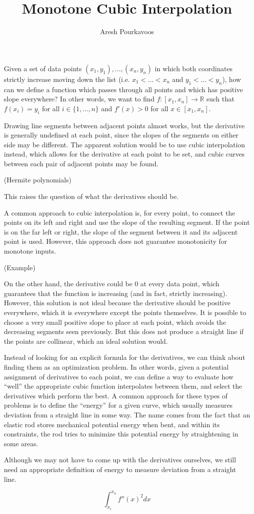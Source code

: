 \documentclass{article}
\begin{document}
\title{Monotone Cubic Interpolation}
\author{Aresh Pourkavoos}
\maketitle

Given a set of data points $(x_1, y_1), \ldots, (x_n, y_n)$
in which both coordinates strictly increase moving down the list
(i.e. $x_1 < \ldots < x_n$ and $y_1 < \ldots < y_n$),
how can we define a function which passes through all points
and which has positive slope everywhere?
In other words, we want to find $f : [x_1, x_n] \rightarrow \mathbb{R}$
such that $f(x_i) = y_i$ for all $i \in \{1, \ldots, n\}$
and $f'(x) > 0$ for all $x \in [x_1, x_n]$.

Drawing line segments between adjacent points almost works,
but the derivative is generally undefined at each point,
since the slopes of the segments on either side may be different.
The apparent solution would be to use cubic interpolation instead,
which allows for the derivative at each point to be set,
and cubic curves between each pair of adjacent points may be found.

(Hermite polynomials)

This raises the question of what the derivatives should be.

A common approach to cubic interpolation
is, for every point,
to connect the points on its left and right
and use the slope of the resulting segment.
If the point is on the far left or right,
the slope of the segment between it and its adjacent point is used.
However, this approach does not guarantee monotonicity for monotone inputs.

(Example)

On the other hand, the derivative could be 0 at every data point,
which guarantees that the function is increasing (and in fact, strictly increasing).
However, this solution is not ideal because
the derivative should be positive everywhere,
which it is everywhere except the points themselves.
It is possible to choose a very small positive slope to place at each point,
which avoids the decreasing segments seen previously.
But this does not produce a straight line if the points are collinear,
which an ideal solution would.

Instead of looking for an explicit formula for the derivatives,
we can think about finding them as an optimization problem.
In other words, given a potential assignment of derivatives to each point,
we can define a way to evaluate how ``well''
the appropriate cubic function interpolates between them,
and select the derivatives which perform the best.
A common approach for these types of problems is to define the ``energy'' for a given curve,
which usually measures deviation from a straight line in some way.
The name comes from the fact that
an elastic rod stores mechanical potential energy when bent,
and within its constraints, the rod tries to minimize this potential energy
by straightening in some areas.

Although we may not have to come up with the derivatives ourselves,
we still need an appropriate definition of energy
to measure deviation from a straight line.

\[\int_{x_1}^{x_n}f''(x)^2 dx\]
\end{document}
